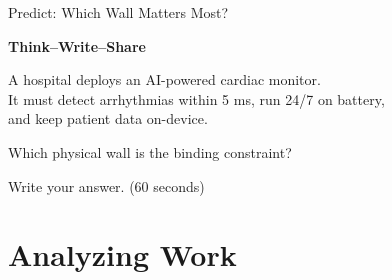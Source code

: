 \documentclass[aspectratio=169, 12pt]{beamer}
\begin{document}
\begin{frame}{Predict: Which Wall Matters Most?}
\note{
%
%
%
%
}

\centering
\vspace{0.8cm}
{\Large\bfseries Think--Write--Share}

\vspace{0.5cm}
{\large A hospital deploys an AI-powered cardiac monitor.\\
It must detect arrhythmias within 5 ms, run 24/7 on battery,\\
and keep patient data on-device.}

\vspace{0.4cm}
{\normalsize Which physical wall is the \alert{binding constraint}?}

\vspace{0.4cm}
{\small\textcolor{midgray}{Write your answer. (60 seconds)}}

\end{frame}

\section{Analyzing Work}
\end{document}
